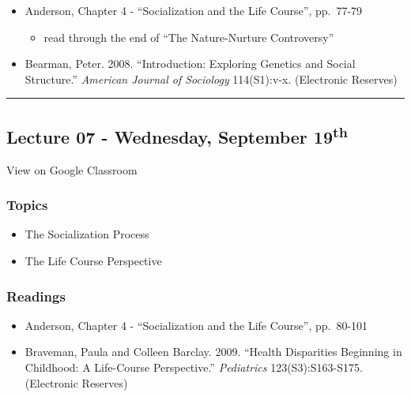\documentclass[]{book}
\providecommand{\tightlist}{%
  \setlength{\itemsep}{0pt}\setlength{\parskip}{0pt}}
\theoremstyle{definition}
\theoremstyle{definition}
\theoremstyle{definition}
\theoremstyle{remark}
\begin{document}
\begin{itemize}
\tightlist
\item
  Anderson, Chapter 4 - ``Socialization and the Life Course'', pp.~77-79

  \begin{itemize}
  \tightlist
  \item
    read through the end of ``The Nature-Nurture Controversy''
  \end{itemize}
\item
  Bearman, Peter. 2008. ``Introduction: Exploring Genetics and Social
  Structure.'' \emph{American Journal of Sociology} 114(S1):v-x.
  (Electronic Reserves)
\end{itemize}

\begin{center}\rule{0.5\linewidth}{\linethickness}\end{center}

\hypertarget{lecture-07---wednesday-september-19th}{%
\subsection*{\texorpdfstring{Lecture 07 - Wednesday, September
19\textsuperscript{th}}{Lecture 07 - Wednesday, September 19th}}\label{lecture-07---wednesday-september-19th}}

View on Google Classroom

\hypertarget{topics-7}{%
\subsubsection*{Topics}\label{topics-7}}

\begin{itemize}
\tightlist
\item
  The Socialization Process
\item
  The Life Course Perspective
\end{itemize}

\hypertarget{readings-7}{%
\subsubsection*{Readings}\label{readings-7}}

\begin{itemize}
\tightlist
\item
  Anderson, Chapter 4 - ``Socialization and the Life Course'',
  pp.~80-101
\item
  Braveman, Paula and Colleen Barclay. 2009. ``Health Disparities
  Beginning in Childhood: A Life-Course Perspective.'' \emph{Pediatrics}
  123(S3):S163-S175. (Electronic Reserves)
\end{itemize}
\end{document}
